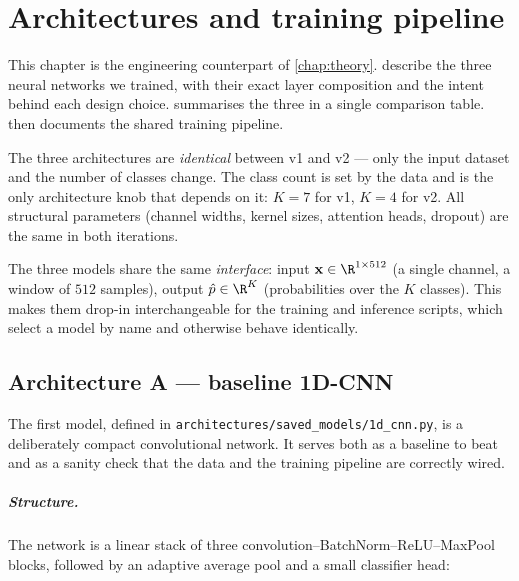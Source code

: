\chapter{Architectures and training pipeline}
\label{chap:archi}

This chapter is the engineering counterpart of \cref{chap:theory}.
 describe the three
neural networks we trained, with their exact layer composition and the
intent behind each design choice.  summarises
the three in a single comparison table.  then
documents the shared training pipeline.

The three architectures are \emph{identical} between v1 and v2 ---
only the input dataset and the number of classes change. The class
count is set by the data and is the only architecture knob that
depends on it: $K = 7$ for v1, $K = 4$ for v2. All structural
parameters (channel widths, kernel sizes, attention heads, dropout)
are the same in both iterations.

The three models share the same \emph{interface}: input
$\mathbf{x} \in \R^{1 \times 512}$ (a single channel, a window of $512$
samples), output $\hat{p} \in \R^{K}$ (probabilities over the $K$
classes). This makes them drop-in interchangeable for the training and
inference scripts, which select a model by name and otherwise behave
identically.

\section{Architecture A --- baseline 1D-CNN}
\label{sec:archi-cnn}

The first model, defined in
\texttt{architectures/saved\_models/1d\_cnn.py}, is a deliberately
compact convolutional network. It serves both as a baseline to beat
and as a sanity check that the data and the training pipeline are
correctly wired.

\paragraph{Structure.} The network is a linear stack of three
convolution--BatchNorm--ReLU--MaxPool blocks, followed by an adaptive
average pool and a small classifier head:

